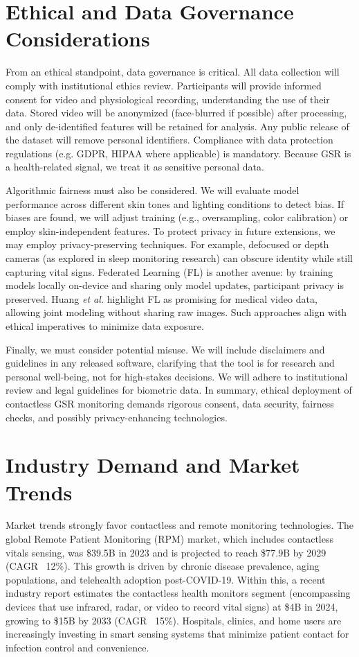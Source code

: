 \documentclass[12pt]{article}
\begin{document}
    \section{Ethical and Data Governance Considerations}
    From an ethical standpoint, data governance is critical. All data collection will comply with institutional ethics review. Participants will provide informed consent for video and physiological recording, understanding the use of their data. Stored video will be anonymized (face-blurred if possible) after processing, and only de-identified features will be retained for analysis. Any public release of the dataset will remove personal identifiers. Compliance with data protection regulations (e.g. GDPR, HIPAA where applicable) is mandatory. Because GSR is a health-related signal, we treat it as sensitive personal data.

    Algorithmic fairness must also be considered. We will evaluate model performance across different skin tones and lighting conditions to detect bias. If biases are found, we will adjust training (e.g., oversampling, color calibration) or employ skin-independent features. To protect privacy in future extensions, we may employ privacy-preserving techniques. For example, defocused or depth cameras (as explored in sleep monitoring research) can obscure identity while still capturing vital signs. Federated Learning (FL) is another avenue: by training models locally on-device and sharing only model updates, participant privacy is preserved. Huang \emph{et al.} highlight FL as promising for medical video data, allowing joint modeling without sharing raw images. Such approaches align with ethical imperatives to minimize data exposure.

    Finally, we must consider potential misuse. We will include disclaimers and guidelines in any released software, clarifying that the tool is for research and personal well-being, not for high-stakes decisions. We will adhere to institutional review and legal guidelines for biometric data. In summary, ethical deployment of contactless GSR monitoring demands rigorous consent, data security, fairness checks, and possibly privacy-enhancing technologies.


    \section{Industry Demand and Market Trends}
    Market trends strongly favor contactless and remote monitoring technologies. The global Remote Patient Monitoring (RPM) market, which includes contactless vitals sensing, was \$39.5B in 2023 and is projected to reach \$77.9B by 2029 (CAGR ~12\%). This growth is driven by chronic disease prevalence, aging populations, and telehealth adoption post-COVID-19. Within this, a recent industry report estimates the contactless health monitors segment (encompassing devices that use infrared, radar, or video to record vital signs) at \$4B in 2024, growing to \$15B by 2033 (CAGR ~15\%). Hospitals, clinics, and home users are increasingly investing in smart sensing systems that minimize patient contact for infection control and convenience.
\end{document}
